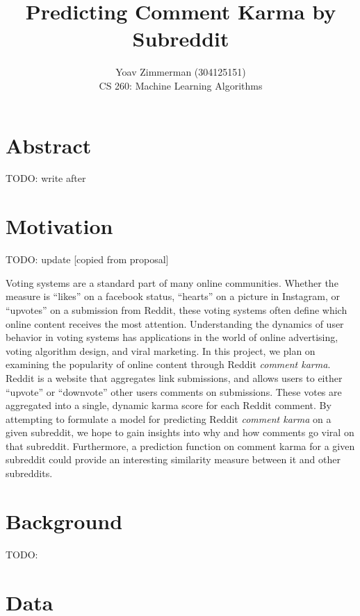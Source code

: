 \documentclass[11pt, twocolumn]{article}
\begin{document}
\title{Predicting Comment Karma by Subreddit}
\author{Yoav Zimmerman (304125151) \\
	    CS 260: Machine Learning Algorithms \\}
\maketitle

\section{Abstract}

TODO: write after

\section{Motivation}

TODO: update [copied from proposal]

Voting systems are a standard part of many online communities. Whether the measure is ``likes'' on a facebook status, “hearts” on a picture in Instagram, or “upvotes” on a submission from Reddit, these voting systems often define which online content receives the most attention. Understanding the dynamics of user behavior in voting systems has applications in the world of online advertising, voting algorithm design, and viral marketing. In this project, we plan on examining the popularity of online content through Reddit \textit{comment karma}. Reddit is a website that aggregates link submissions, and allows users to either “upvote” or “downvote” other users comments on submissions. These votes are aggregated into a single, dynamic karma score for each Reddit comment. By attempting to formulate a model for predicting Reddit \textit{comment karma} on a given subreddit, we hope to gain insights into why and how comments go viral on that subreddit. Furthermore, a prediction function on comment karma for a given subreddit could provide an interesting similarity measure between it and other subreddits.

\section{Background}

TODO:

\section{Data}
\end{document}
